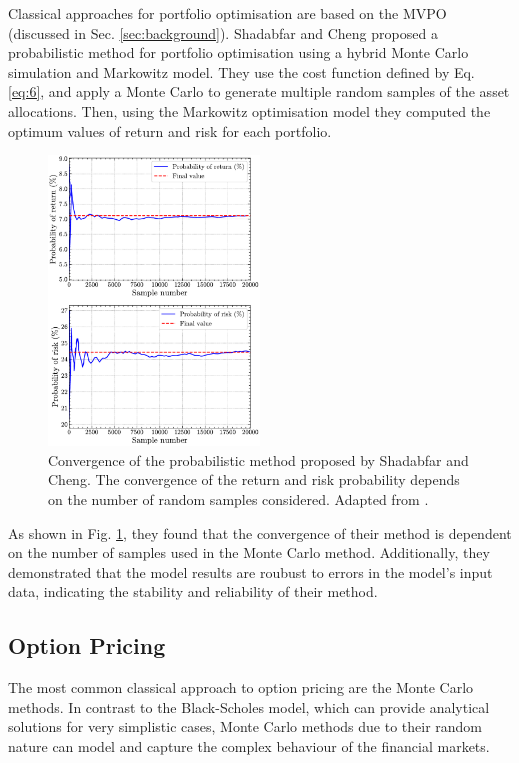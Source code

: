 \documentclass[prx,twocolumn,floatfix,superscriptaddress,longbibliography]{revtex4-1}
\begin{document}
Classical approaches for portfolio optimisation are based on the MVPO (discussed in Sec. \ref{sec:background}).  
Shadabfar and  Cheng \cite{Shadabfar2020} proposed a probabilistic method for portfolio optimisation using a hybrid Monte Carlo simulation and Markowitz model. They use the cost function defined by Eq. 
\ref{eq:6}, and apply a Monte Carlo to generate multiple random samples of the asset allocations. Then, using the Markowitz optimisation model they computed the optimum values of return and risk for each portfolio. 
\begin{figure}[h!]
\centering 
\includegraphics[width=0.5\textwidth]{return-risk-error.pdf}
  \caption{\label{fig:monte-carlo} Convergence of the probabilistic method proposed by Shadabfar and Cheng. The convergence of the return and risk probability depends on the number of random samples considered. Adapted from \cite{Shadabfar2020}.} 
\end{figure}

As shown in Fig. \ref{fig:monte-carlo}, they found that the convergence of their method is dependent on the number of samples used in the Monte Carlo method. Additionally, they demonstrated that the model results 
are roubust to errors in the model's input data, indicating the stability and reliability of their method.

\subsection{Option Pricing}

 The most common classical approach to option pricing are the Monte Carlo methods. In contrast to the Black-Scholes model, which can provide 
 analytical solutions for very simplistic cases, Monte Carlo methods due to their random nature can model and capture the 
 complex behaviour of the financial markets. 
\end{document}
